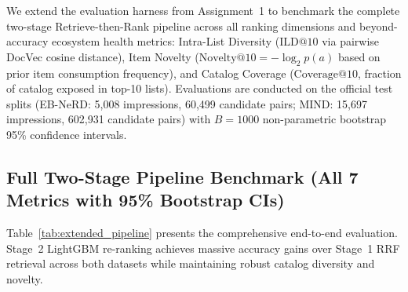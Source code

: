 \documentclass[11pt,a4paper]{article}
\begin{document}
We extend the evaluation harness from Assignment~1 to benchmark the complete two-stage Retrieve-then-Rank pipeline across all ranking dimensions and beyond-accuracy ecosystem health metrics: Intra-List Diversity ($\text{ILD@10}$ via pairwise DocVec cosine distance), Item Novelty ($\text{Novelty@10} = -\log_2 p(a)$ based on prior item consumption frequency), and Catalog Coverage ($\text{Coverage@10}$, fraction of catalog exposed in top-10 lists). Evaluations are conducted on the official test splits (EB-NeRD: 5,008 impressions, 60,499 candidate pairs; MIND: 15,697 impressions, 602,931 candidate pairs) with $B{=}1000$ non-parametric bootstrap 95\% confidence intervals.

\subsection{Full Two-Stage Pipeline Benchmark (All 7 Metrics with 95\% Bootstrap CIs)}

Table~\ref{tab:extended_pipeline} presents the comprehensive end-to-end evaluation. Stage~2 LightGBM re-ranking achieves massive accuracy gains over Stage~1 RRF retrieval across both datasets while maintaining robust catalog diversity and novelty.
\end{document}
